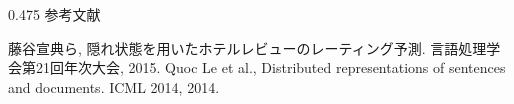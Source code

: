 \documentclass[unicode,10pt]{beamer}
\newcommand{\columnsize}{0.475\textwidth}
\begin{document}
\begin{frame}
\begin{columns}[onlytextwidth,t]
\begin{column}{\columnsize}
  参考文献
  
  \begin{thebibliography}{9}
    藤谷宣典ら,
    隠れ状態を用いたホテルレビューのレーティング予測.
    言語処理学会第21回年次大会, 2015.
    Quoc Le et al.,
    Distributed representations of sentences and documents.
    ICML 2014, 2014.
  \end{thebibliography}
\end{column}

\end{columns}
\end{frame}
\end{document}
